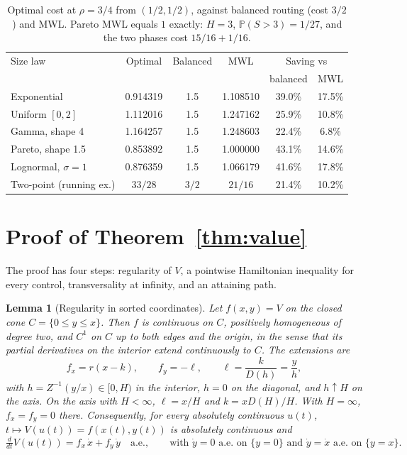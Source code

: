 \documentclass[11pt]{article}
\numberwithin{equation}{section}
\newtheorem{lemma}[theorem]{Lemma}
\theoremstyle{definition}
\theoremstyle{remark}
\newcommand{\Prob}{\mathbb{P}}
\begin{document}
\begin{table}[h]
\centering\small
\caption{Optimal cost at $\rho=3/4$ from $(1/2,1/2)$, against balanced routing (cost $3/2$) and MWL. Pareto MWL equals $1$ exactly: $H=3$, $\Prob(S>3)=1/27$, and the two phases cost $15/16+1/16$.}\label{tab:gain}
\begin{tabular}{@{}lccccc@{}}
\toprule
Size law & Optimal & Balanced & MWL & \multicolumn{2}{c}{Saving vs}\\
 & & & & balanced & MWL\\
\midrule
Exponential & 0.914319 & 1.5 & 1.108510 & 39.0\% & 17.5\%\\
Uniform $[0,2]$ & 1.112016 & 1.5 & 1.247162 & 25.9\% & 10.8\%\\
Gamma, shape 4 & 1.164257 & 1.5 & 1.248603 & 22.4\% & 6.8\%\\
Pareto, shape 1.5 & 0.853892 & 1.5 & 1.000000 & 43.1\% & 14.6\%\\
Lognormal, $\sigma=1$ & 0.876359 & 1.5 & 1.066179 & 41.6\% & 17.8\%\\
Two-point (running ex.) & $33/28$ & $3/2$ & $21/16$ & 21.4\% & 10.2\%\\
\bottomrule
\end{tabular}
\end{table}

\section{Proof of Theorem~\ref{thm:value}}\label{sec:proof}

The proof has four steps: regularity of $V$, a pointwise Hamiltonian inequality for every control, transversality at infinity, and an attaining path.

\begin{lemma}[Regularity in sorted coordinates]\label{lem:C1}
Let $f(x,y)=V$ on the closed cone $C=\{0\le y\le x\}$. Then $f$ is continuous on $C$, positively homogeneous of degree two, and $C^1$ on $C$ up to both edges and the origin, in the sense that its partial derivatives on the interior extend continuously to $C$. The extensions are
\begin{equation}\label{eq:grad}
f_x=r(x-k),\qquad f_y=-\ell,\qquad \ell=\frac{k}{D(h)}=\frac yh,
\end{equation}
with $h=Z^{-1}(y/x)\in[0,H)$ in the interior, $h=0$ on the diagonal, and $h\uparrow H$ on the axis. On the axis with $H<\infty$, $\ell=x/H$ and $k=xD(H)/H$. With $H=\infty$, $f_x=f_y=0$ there. Consequently, for every absolutely continuous $u(t)$, $t\mapsto V(u(t))=f(x(t),y(t))$ is absolutely continuous and
\begin{equation}\label{eq:chain}
\tfrac{d}{dt}V(u(t))=f_x\,\dot x+f_y\,\dot y\quad\text{a.e.},\qquad\text{with }\dot y=0\text{ a.e. on }\{y=0\}\text{ and }\dot y=\dot x\text{ a.e. on }\{y=x\}.
\end{equation}
\end{lemma}
\end{document}
